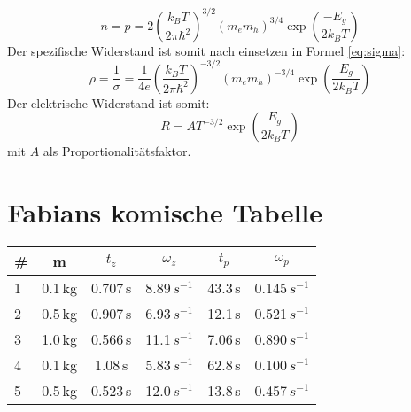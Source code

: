 \documentclass[a4paper]{scrartcl}
\begin{document}
\begin{equation}
n = p = 2 \left(\frac{k_B T}{2 \pi \hbar^2}\right)^{3/2} (m_e m_h)^{3/4} \exp \left(\frac{-E_g}{2 k_B T}\right)
\end{equation}
Der spezifische Widerstand ist somit nach einsetzen in Formel \ref{eq:sigma}:
\begin{equation}
\rho = \frac{1}{\sigma} = \frac{1}{4e} \left(\frac{k_B T}{2 \pi \hbar^2}\right)^{-3/2} (m_e m_h)^{-3/4} \exp \left(\frac{E_g}{2 k_B T}\right)
\end{equation}
Der elektrische Widerstand ist somit:
\begin{equation}
R = A T^{-3/2} \exp \left(\frac{E_g}{2 k_B T}\right)
\end{equation}
mit $A$ als Proportionalitätsfaktor. 


\section{Fabians komische Tabelle}

\begin{tabular}{lccccc}
	\hline
	\# & m & $t_{z}$ & $\omega_{z}$ & $t_{p}$ & $\omega_{p}$ \\
	\hline
	1 & 0.1\,kg & 0.707\,s & 8.89\,$s^{-1}$ & 43.3\,s & 0.145\,$s^{-1}$\\
	2 & 0.5\,kg & 0.907\,s & 6.93\,$s^{-1}$ & 12.1\,s & 0.521\,$s^{-1}$\\
	3 & 1.0\,kg & 0.566\,s & 11.1\,$s^{-1}$ & 7.06\,s & 0.890\,$s^{-1}$\\
	4 & 0.1\,kg & 1.08\,s & 5.83\,$s^{-1}$ & 62.8\,s & 0.100\,$s^{-1}$\\
	5 & 0.5\,kg & 0.523\,s & 12.0\,$s^{-1}$ & 13.8\,s & 0.457\,$s^{-1}$\\
\end{tabular}\\
\end{document}
